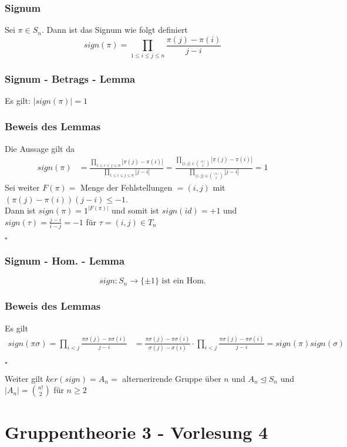 \documentclass[12pt, german]{article}
\newcommand\ddfrac[2]{\frac{\displaystyle #1}{\displaystyle #2}}
\newcommand{\bewiesen}{
	
	\begin{flushright}
		$\square$  \\
\end{flushright}}
\begin{document}
	\subsubsection{Signum}
	Sei $\pi \in S_n$. Dann ist das Signum wie folgt definiert $$sign(\pi) = \prod_{1 \leq i \leq j \leq n} \frac{\pi(j) - \pi(i)}{j -i}$$
	
	\subsubsection{Signum - Betrags - Lemma}
	Es gilt: $|sign(\pi) |= 1$
	
	\subsubsection{Beweis des Lemmas}
	Die Aussage gilt da 
	\begin{align*}
		sign(\pi) &= \ddfrac{\prod_{1 \leq i \leq j \leq n}  |\pi(j) - \pi(i)|}{\prod_{1 \leq i \leq j \leq n}  |j -i|} = \ddfrac{ \prod_{ \{i,j\} \in \binom{[n]}{2}} |\pi(j) - \pi(i)| }{ \prod_{ \{i,j\} \in \binom{[n]}{2}} |j - i|} = 1
	\end{align*}
	Sei weiter $F(\pi) = $ Menge der Fehlstellungen $= (i,j)$ mit $(\pi(j) - \pi(i))(j-i) \leq -1$. \\
	
	Dann ist $sign(\pi)= 1^{|F(\pi)|}$ und somit ist $sign(id) = +1$ und $sign(\tau) = \frac{j-i}{i-j} = -1$ für $\tau= (i,j) \in T_n$
	\bewiesen
	
	\subsubsection{Signum - Hom. - Lemma}
	$$ sign: S_n \to \{ \pm 1\} \text{ ist ein Hom.}$$
	
	\subsubsection{Beweis des Lemmas}
	Es gilt 
	\begin{align*}
		sign(\pi\sigma) = \prod_{ i < j} \ddfrac{\pi\sigma(j) - \pi \sigma(i)}{j -i} &=  \ddfrac{\pi\sigma(j) - \pi \sigma(i)}{\sigma(j) -\sigma(i)} \cdot \prod_{ i < j}\ddfrac{\pi\sigma(j) - \pi \sigma(i)}{j -i} = sign(\pi) sign(\sigma)
	\end{align*}
	\bewiesen
	Weiter gilt $ker(sign) = A_n = $ alternerirende Gruppe über $n$ und $A_n \trianglelefteq S_n$ und $|A_n| = \binom{n!}{2}$ für $n \geq 2$ 
	
	\section{Gruppentheorie 3 - Vorlesung 4}
\end{document}
